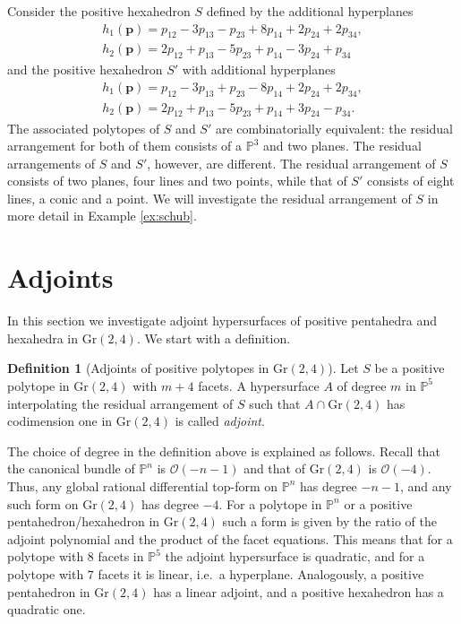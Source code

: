 \documentclass[12pt]{extarticle}
\theoremstyle{definition}
\newtheorem{definition}[theorem]{Definition}
\newenvironment{example}
{\pushQED{\qed}\renewcommand{\qedsymbol}{$\diamond$}\examplex}
{\popQED\endexamplex}
\begin{document}
\begin{example}\label{ex:combcomp}
    Consider the positive hexahedron $S$ defined by the additional hyperplanes 
   \begin{gather*}
         h_1(\mathbf{p}) = p_{12} - 3p_{13} - p_{23} + 8p_{14} + 2p_{24}+2p_{34},\\
    h_2(\mathbf{p}) = 2p_{12} + p_{13} - 5p_{23}+p_{14}-3p_{24}+p_{34}
    \end{gather*}
and the positive hexahedron $S'$ with additional hyperplanes 
\begin{gather*}
     h_1(\mathbf{p}) = p_{12} - 3p_{13} + p_{23} - 8p_{14} + 2p_{24}+2p_{34} ,\\
    h_2(\mathbf{p}) = 2p_{12} + p_{13} - 5p_{23}+p_{14}+3p_{24}-p_{34}.
\end{gather*}
The associated polytopes of $S$ and $S'$ are combinatorially equivalent: the residual arrangement for both of them consists of a $\mathbb{P}^3$ and two planes. The residual arrangements of $S$ and $S'$, however, are different. The residual arrangement of $S$ consists of two planes, four lines and two points, while that of $S'$ consists of eight lines, a conic and a point. We will investigate the residual arrangement of $S$ in more detail in Example \ref{ex:schub}.
\end{example}

\section{Adjoints} \label{sec:4}
In this section we investigate adjoint hypersurfaces of positive pentahedra and hexahedra in $\mathrm{Gr}(2,4)$. We start with a definition. 

\begin{definition}[Adjoints of positive polytopes in $\mathrm{Gr}(2,4)$]
    Let $S$ be a positive polytope in $\mathrm{Gr}(2,4)$ with $m+4$ facets. A hypersurface $A$ of degree $m$ in $\mathbb{P}^5$ interpolating the residual arrangement of $S$ such that $A\cap \mathrm{Gr}(2,4)$ has codimension one in $\mathrm{Gr}(2,4)$ is called \emph{adjoint}.
\end{definition}

The choice of degree in the definition above is explained as follows. Recall that the canonical bundle of $\mathbb{P}^n$ is $\mathcal{O}(-n-1)$ and that of $\mathrm{Gr}(2,4)$ is $\mathcal{O}(-4)$. Thus, any global rational differential top-form on $\mathbb{P}^n$ has degree $-n-1$, and any such form on $\mathrm{Gr}(2,4)$ has degree $-4$. For a polytope in $\mathbb{P}^n$ or a positive pentahedron/hexahedron in $\mathrm{Gr}(2,4)$ such a form is given by the ratio of the adjoint polynomial and the product of the facet equations. This means that for a polytope with $8$ facets in $\mathbb{P}^5$ the adjoint hypersurface is quadratic, and for a polytope with $7$ facets it is linear, i.e.\ a hyperplane. Analogously, a positive pentahedron in $\mathrm{Gr}(2,4)$ has a linear adjoint, and a positive hexahedron has a quadratic one.
\end{document}
